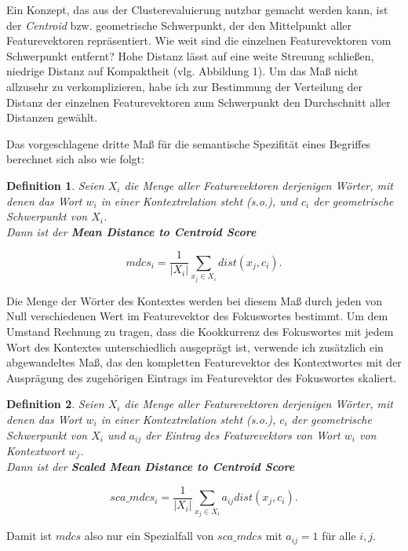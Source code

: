 \documentclass[11pt,numbers=noenddot]{scrartcl}
\newtheorem*{defi}{Definition}
\begin{document}
Ein Konzept, das aus der Clusterevaluierung nutzbar gemacht werden kann, ist der \emph{Centroid} bzw. geometrische Schwerpunkt, der den Mittelpunkt aller Featurevektoren repräsentiert. Wie weit sind die einzelnen Featurevektoren vom Schwerpunkt entfernt? Hohe Distanz lässt auf eine weite Streuung schließen, niedrige Distanz auf Kompaktheit (vlg. Abbildung 1). Um das Maß nicht allzusehr zu verkomplizieren, habe ich zur Bestimmung der Verteilung der Distanz der einzelnen Featurevektoren zum Schwerpunkt den Durchschnitt aller Distanzen gewählt.

Das vorgeschlagene dritte Maß für die semantische Spezifität eines Begriffes berechnet sich also wie folgt:

\begin{defi}
Seien $X_i$ die Menge aller Featurevektoren derjenigen Wörter, mit denen das Wort $w_i$ in einer Kontextrelation steht (s.o.), und $c_i$ der geometrische Schwerpunkt von $X_i$. \\ Dann ist der \textbf{Mean Distance to Centroid Score}

\begin{equation}
   mdcs_i =  \frac{1}{|X_i|} \sum_{x_j \in X_i} dist(x_j, c_i).
\end{equation}
\end{defi}

Die Menge der Wörter des Kontextes werden bei diesem Maß durch jeden von Null verschiedenen Wert im Featurevektor des Fokuswortes bestimmt. Um dem Umstand Rechnung zu tragen, dass die Kookkurrenz des Fokuswortes mit jedem Wort des Kontextes unterschiedlich ausgeprägt ist, verwende ich zusätzlich ein abgewandeltes Maß, das den kompletten Featurevektor des Kontextwortes mit der Ausprägung des zugehörigen Eintrags im Featurevektor des Fokuswortes skaliert.

\begin{defi}
Seien $X_i$ die Menge aller Featurevektoren derjenigen Wörter, mit denen das Wort $w_i$ in einer Kontextrelation steht (s.o.), $c_i$ der geometrische Schwerpunkt von $X_i$ und $a_{ij}$ der Eintrag des Featurevektors von Wort $w_i$ von Kontextwort $w_j$. \\ Dann ist der \textbf{Scaled Mean Distance to Centroid Score}

$$
  sca\_mdcs_i =  \frac{1}{|X_i|} \sum_{x_j \in X_i}  a_{ij} dist(x_j, c_i).
$$

\end{defi}

Damit ist $mdcs$ also nur ein Spezialfall von $sca\_mdcs$ mit $a_{ij} = 1$ für alle $i,j$.
\end{document}
